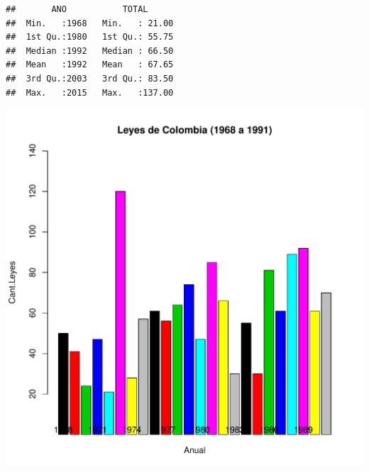 \documentclass[conference]{IEEEtran}\usepackage[]{graphicx}\usepackage[]{color}
\makeatletter
\def\maxwidth{ %
  \ifdim\Gin@nat@width>\linewidth
    \linewidth
  \else
    \Gin@nat@width
  \fi
}
\newenvironment{kframe}{%
 \def\at@end@of@kframe{}%
 \ifinner\ifhmode%
  \def\at@end@of@kframe{\end{minipage}}%
  \begin{minipage}{\columnwidth}%
 \fi\fi%
 \def\FrameCommand##1{\hskip\@totalleftmargin \hskip-\fboxsep
 \colorbox{shadecolor}{##1}\hskip-\fboxsep
     \hskip-\linewidth \hskip-\@totalleftmargin \hskip\columnwidth}%
 \MakeFramed {\advance\hsize-\width
   \@totalleftmargin\z@ \linewidth\hsize
   \@setminipage}}%
 {\par\unskip\endMakeFramed%
 \at@end@of@kframe}
\newenvironment{knitrout}{}{} %
\makeatother
\begin{document}
\begin{knitrout}
\color{fgcolor}\begin{kframe}
\begin{verbatim}
##       ANO           TOTAL       
##  Min.   :1968   Min.   : 21.00  
##  1st Qu.:1980   1st Qu.: 55.75  
##  Median :1992   Median : 66.50  
##  Mean   :1992   Mean   : 67.65  
##  3rd Qu.:2003   3rd Qu.: 83.50  
##  Max.   :2015   Max.   :137.00
\end{verbatim}
\end{kframe}
\end{knitrout}

\begin{knitrout}
\color{fgcolor}
\includegraphics[width=\maxwidth]{figure/unnamed-chunk-2-1} 

\end{knitrout}
\end{document}
